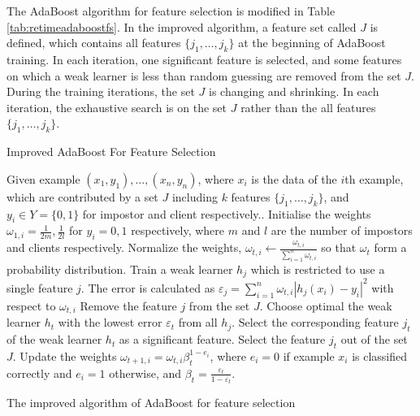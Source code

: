 The AdaBoost algorithm for feature selection is modified in \mbox{Table} \ref{tab:retimeadaboostfs}. In the improved algorithm, a feature set called $J$ is defined, which contains all features $\{j_{1},\ldots,j_{k}\}$ at the beginning of AdaBoost training. In each iteration, one significant feature is selected, and some features on which a weak learner is less than random guessing are removed from the set $J$. During the training iterations, the set $J$ is changing and shrinking. In each iteration, the exhaustive search is on the set $J$ rather than the all features $\{j_{1},\ldots,j_{k}\}$. 
\begin{table}
Improved AdaBoost For Feature Selection 
\begin{algorithmic}[1]
\STATE Given example $(x_{1},y_{1}),\ldots,(x_{n},y_{n})$, where $x_{i}$ is the data of the $i$th example, which are contributed by a set $J$ including $k$ features $\{j_{1},\ldots,j_{k}\}$, and $y_{i} \in Y=\{0,1\}$ for impostor and client respectively..
\STATE Initialise the weights $\omega_{1,i}=\frac{1}{2m},\frac{1}{2l}$ for $y_{i}=0,1$ respectively, where $m$ and $l$ are the number of impostors and clients respectively.
	\STATE Normalize the weights, $\omega_{t,i}\leftarrow\frac{\omega_{t,i}}{\sum_{i=1}^{n}\omega_{t,i}}$ so that $\omega_{t}$ form a probability distribution.
		\STATE Train a weak learner $h_{j}$ which is restricted to use a single feature $j$. 
		\STATE The error is calculated as $\varepsilon_{j}=\sum_{i=1}^{n}\omega_{t,i}|h_{j}(x_{i})-y_{i}|^{2}$ with respect to $\omega_{t,i}$
			\STATE Remove the feature $j$ from the set $J$.
		\ENDIF
	\ENDFOR
	\STATE Choose optimal the weak learner $h_{t}$ with the lowest error $\varepsilon_{t}$ from all $h_{j}$.
	\STATE Select the corresponding feature $j_{t}$ of the weak learner $h_{t}$ as a significant feature.
	\STATE Select the feature $j_{t}$ out of the set $J$.
	\STATE Update the weights $\omega_{t+1,i}=\omega_{t,i}\beta_{t}^{1-e_{i}}$, where $e_{i}=0$ if example $x_{i}$ is classified correctly and $e_{i}=1$ otherwise, and $\beta_{t}=\frac{\varepsilon_{t}}{1-\varepsilon_{t}}$.	
\ENDFOR
\end{algorithmic}
\caption{The improved algorithm of AdaBoost for feature selection}
\label{tab:retimeadaboostfs}
\end{table} 

